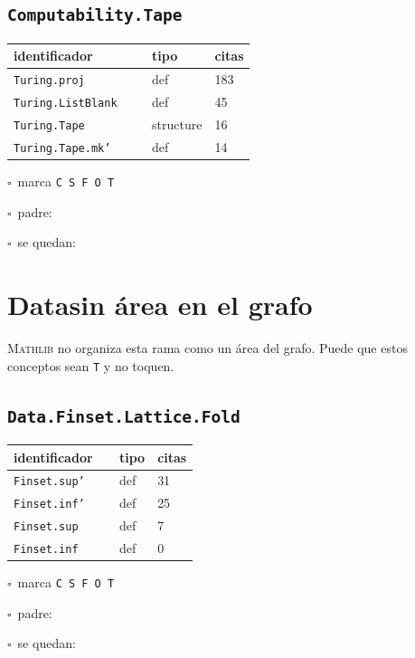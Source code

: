 \documentclass[10pt,a4paper]{article}
\newcommand{\Mathlib}{\textsc{Mathlib}}
\begin{document}
\subsection*{\texttt{Computability.Tape}}
\noindent\begin{minipage}{0.56\linewidth}\small\begin{tabular}{@{}>{\raggedright\arraybackslash}p{0.58\linewidth}ll@{}}\toprule
identificador & tipo & citas\\\midrule
\texttt{Turing.\allowbreak{}proj} & def & 183\\
\texttt{Turing.\allowbreak{}ListBlank} & def & 45\\
\texttt{Turing.\allowbreak{}Tape} & structure & 16\\
\texttt{Turing.\allowbreak{}Tape.\allowbreak{}mk'} & def & 14\\
\bottomrule\end{tabular}\end{minipage}\hfill\begin{minipage}{0.40\linewidth}\small$\square$~marca \texttt{C S F O T}\par\smallskip$\square$~padre: \dotfill\par\smallskip$\square$~se quedan: \dotfill\par\end{minipage}\par\medskip
\section{Data\hfill{\normalsize\normalfont \textbf{sin área en el grafo}}}
\begin{aviso}\Mathlib{} no organiza esta rama como un área del grafo. Puede que estos conceptos sean \texttt{T} y no toquen.\end{aviso}
\subsection*{\texttt{Data.Finset.Lattice.Fold}}
\noindent\begin{minipage}{0.56\linewidth}\small\begin{tabular}{@{}>{\raggedright\arraybackslash}p{0.58\linewidth}ll@{}}\toprule
identificador & tipo & citas\\\midrule
\texttt{Finset.\allowbreak{}sup'} & def & 31\\
\texttt{Finset.\allowbreak{}inf'} & def & 25\\
\texttt{Finset.\allowbreak{}sup} & def & 7\\
\texttt{Finset.\allowbreak{}inf} & def & 0\\
\bottomrule\end{tabular}\end{minipage}\hfill\begin{minipage}{0.40\linewidth}\small$\square$~marca \texttt{C S F O T}\par\smallskip$\square$~padre: \dotfill\par\smallskip$\square$~se quedan: \dotfill\par\end{minipage}\par\medskip
\end{document}
